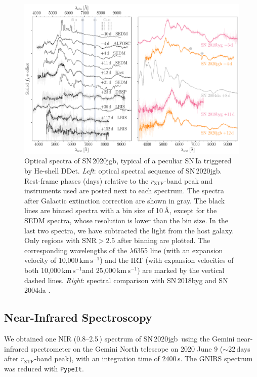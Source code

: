 \documentclass[twocolumn]{aastex631}
\newcommand{\sn}{SN\,2020jgb}
\newcommand{\kms}{$\mathrm{km}\,\mathrm{s}^{-1}$}
\begin{document}
\begin{CJK*}{UTF8}{gbsn}

\begin{figure}
    \centering
    \includegraphics[width=\textwidth]{optical_spec_evolution.pdf}
    \caption{Optical spectra of \sn, typical of a peculiar SN\,Ia triggered by He-shell DDet. \textit{Left}: optical spectral sequence of \sn. Rest-frame phases (days) relative to the $r_\mathrm{ZTF}$-band peak and instruments used are posted next to each spectrum. The spectra after Galactic extinction correction are shown in gray. The black lines are binned spectra with a bin size of 10\,\AA, except for the SEDM spectra, whose resolution is lower than the bin size. In the last two spectra, we have subtracted the light from the host galaxy. Only regions with $\mathrm{SNR}>2.5$ after binning are plotted. The corresponding wavelengths of the  $\lambda$6355 line (with an expansion velocity of 10,000\,\kms) and the  IRT (with expansion velocities of both 10,000\,\kms and 25,000\,\kms) are marked by the vertical dashed lines.
    \textit{Right}: spectral comparison with SN\,2018byg \citep[subluminous He-shell DDet;][]{de_18byg_2019} and SN\,2004da \citep[normal luminosity;][]{Silverman_2012}.}
    \label{fig:spec_evo}
\end{figure}

\subsection{Near-Infrared Spectroscopy}
We obtained one NIR (0.8--2.5\,\micron) spectrum of \sn\ using the Gemini near-infrared spectrometer \citep[GNIRS;][]{GNIRS1998} on the Gemini North telescope on 2020 June 9 ($\sim$22\,days after $r_\mathrm{ZTF}$-band peak), with an integration time of 2400\,s. The GNIRS spectrum was reduced with \texttt{PypeIt}.


\end{CJK*}
\end{document}
